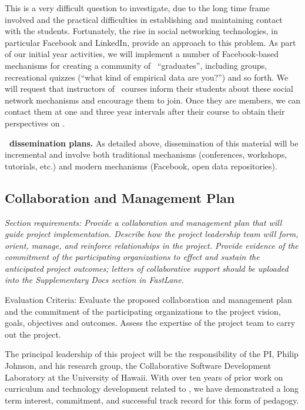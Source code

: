 This is a very difficult question to investigate, due to the long time
frame involved and the practical difficulties in establishing and
maintaining contact with the students.  Fortunately, the rise in social
networking technologies, in particular Facebook and LinkedIn, provide an approach to
this problem.  As part of our initial year activities, we will implement a
number of Facebook-based mechanisms for creating a community of \eCT\
``graduates'', including groups, recreational quizzes (``what kind of
empirical data are you?'') and so forth.  We will request that instructors
of \eCT\ courses inform their students about these social network
mechanisms and encourage them to join.  Once they are members, we can
contact them at one and three year intervals after their course to obtain
their perspectives on \eCT.

{\bf \eCT\ dissemination plans.}  As detailed above, dissemination of this
material will be incremental and involve both traditional mechanisms
(conferences, workshops, tutorials, etc.) and modern mechanisms (Facebook,
open data repositories).

\subsection{Collaboration and Management Plan}

{\em Section requirements: Provide a collaboration and management plan that
will guide project implementation.  Describe how the project leadership
team will form, orient, manage, and reinforce relationships in the project.
Provide evidence of the commitment of the participating organizations to
effect and sustain the anticipated project outcomes; letters of
collaborative support should be uploaded into the Supplementary Docs
section in FastLane.

Evaluation Criteria: Evaluate the proposed collaboration and management
plan and the commitment of the participating organizations to the project
vision, goals, objectives and outcomes.  Assess the expertise of the
project team to carry out the project.
}
\bigskip

The principal leadership of this project will be the responsibility of the
PI, Philip Johnson, and his research group, the Collaborative Software
Development Laboratory at the University of Hawaii.  With over ten years of
prior work on curriculum and technology development related to \eCT, we have
demonstrated a long term interest, commitment, and successful track record
for this form of pedagogy.

